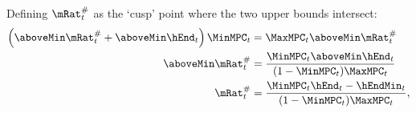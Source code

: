   Defining $\mtCusp$ as the `cusp' point where the two upper bounds
  intersect:
  \begin{equation*}\begin{gathered}\begin{aligned}
    \left(\aboveMin \mtCusp+\aboveMin \hEnd_{t}\right)\MinMPC_{t}  & =  \MaxMPC_{t} \aboveMin \mtCusp \\
    \aboveMin \mtCusp  & =  \frac{\MinMPC_{t}\aboveMin \hEnd_{t}}{(1-\MinMPC_{t})\MaxMPC_{t}} \\
    \mtCusp  & =  \frac{\MinMPC_{t}\hEnd_{t}-\hEndMin_{t}}{(1-\MinMPC_{t})\MaxMPC_{t}},
  \end{aligned}\end{gathered}\end{equation*}
